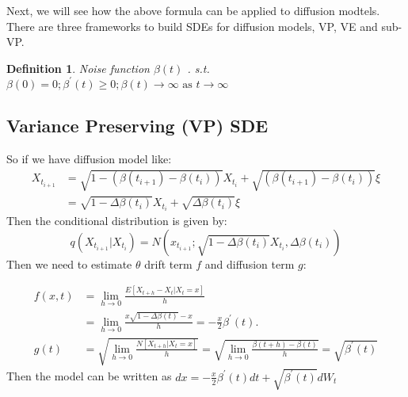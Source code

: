 \documentclass{ctexart}
\newtheorem{definition}{Definition}
\begin{document}
Next, we will see how the above formula can be applied to diffusion modtels. There are three frameworks to build SDEs for diffusion models, VP, VE and sub-VP.
\begin{definition}
    Noise function  $\beta(t)$ . s.t. $\beta(0)=0 ; \beta^{\prime}(t) \geqslant 0 ; \beta(t) \rightarrow \infty \text { as } t \rightarrow \infty$
\end{definition}

\subsection{Variance Preserving (VP) SDE}
So if we have diffusion model like:
\begin{equation}
\begin{aligned}
    X_{t_{i+1}}&=\sqrt{1-\left(\beta\left(t_{i+1}\right)-\beta\left(t_{i}\right)\right)}X_{t_i}+\sqrt{\left(\beta\left(t_{i+1}\right)-\beta\left(t_{i}\right)\right)}\xi\\
    &=\sqrt{1-\Delta\beta(t_i)}X_{t_i}+\sqrt{\Delta \beta(t_i)}\xi
\end{aligned}
\end{equation}
Then the conditional distribution is given by:
\begin{equation}
    q\left(X_{t_{i+1}} | X_{t_{i}}\right)=N(x_{t_{i+1}} ; \sqrt{1-\Delta \beta\left(t_{i}\right)}X_{t_i}, \Delta \beta\left(t_{i}\right))
\end{equation}
Then we need to estimate  $\theta$  drift term  $f$  and diffusion term  $g$:

\begin{equation}
    \begin{aligned}
        f(x, t)&=\lim _{h \rightarrow 0} \frac{E\left[X_{t+h}-X_{t} | X_{t}=x\right]}{h} \\
            &=\lim _{h \rightarrow 0} \frac{x \sqrt{1-\Delta \beta(t)}-x}{h}=-\frac{x}{2} \beta^{\prime}(t) . \\
    g(t) &= \sqrt{\lim _{h \rightarrow 0} \frac{N\left[X_{t+h} | X_{t}=x\right]}{h}}=\sqrt{\lim _{h \rightarrow 0} \frac{\beta(t+h)-\beta(t)}{h}}=\sqrt{\beta^{\prime}(t)}
    \end{aligned}
\end{equation}
Then the model can be written as
$d x=-\frac{x}{2} \beta^{\prime}(t) d t+\sqrt{\beta^{\prime}(t)} d W_{t}$
\end{document}
